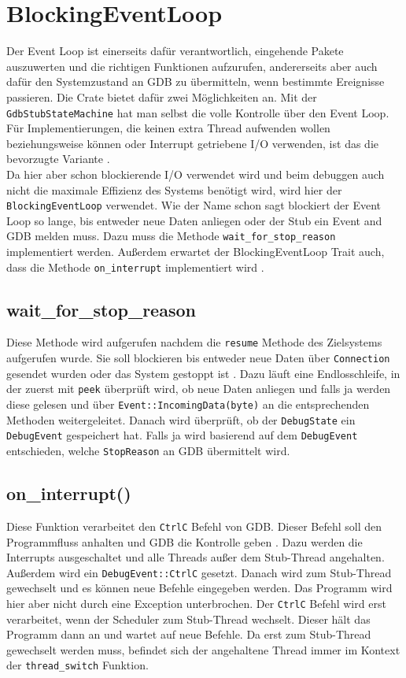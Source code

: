 \section{BlockingEventLoop}
Der Event Loop ist einerseits dafür verantwortlich, eingehende Pakete auszuwerten und die richtigen Funktionen aufzurufen, andererseits aber auch dafür den Systemzustand an GDB zu übermitteln, wenn bestimmte Ereignisse passieren. Die Crate bietet dafür zwei Möglichkeiten an. Mit der \texttt{GdbStubStateMachine} hat man selbst die volle Kontrolle über den Event Loop. Für Implementierungen, die keinen extra Thread aufwenden wollen beziehungsweise können oder Interrupt getriebene I/O verwenden, ist das die bevorzugte Variante \cite{gdbstub}.\\ 
Da hier aber schon blockierende I/O verwendet wird und beim debuggen auch nicht die maximale Effizienz des Systems benötigt wird, wird hier der \texttt{BlockingEventLoop} verwendet. Wie der Name schon sagt blockiert der Event Loop so lange, bis entweder neue Daten anliegen oder der Stub ein Event and GDB melden muss. Dazu muss die Methode \texttt{wait\_for\_stop\_reason} implementiert werden. Außerdem erwartet der BlockingEventLoop Trait auch, dass die Methode \texttt{on\_interrupt} implementiert wird \cite{gdbstub}.

\subsection{wait\_for\_stop\_reason}
Diese Methode wird aufgerufen nachdem die \texttt{resume} Methode des Zielsystems aufgerufen wurde. Sie soll blockieren bis entweder neue Daten über \texttt{Connection} gesendet wurden oder das System gestoppt ist \cite{gdbstub}. Dazu läuft eine Endlosschleife, in der zuerst mit \texttt{peek} überprüft wird, ob neue Daten anliegen und falls ja werden diese gelesen und über \texttt{Event::IncomingData(byte)} an die entsprechenden Methoden weitergeleitet. Danach wird überprüft, ob der \texttt{DebugState} ein \texttt{DebugEvent} gespeichert hat. Falls ja wird basierend auf dem \texttt{DebugEvent} entschieden, welche \texttt{StopReason} an GDB übermittelt wird.

\subsection{on\_interrupt()}
Diese Funktion verarbeitet den \texttt{CtrlC} Befehl von GDB. Dieser Befehl soll den Programmfluss anhalten und GDB die Kontrolle geben \cite{gdb}. Dazu werden die Interrupts ausgeschaltet und alle Threads außer dem Stub-Thread angehalten. Außerdem wird ein \texttt{DebugEvent::CtrlC} gesetzt. Danach wird zum Stub-Thread gewechselt und es können neue Befehle eingegeben werden. Das Programm wird hier aber nicht durch eine Exception unterbrochen. Der \texttt{CtrlC} Befehl wird erst verarbeitet, wenn der Scheduler zum Stub-Thread wechselt. Dieser hält das Programm dann an und wartet auf neue Befehle. Da erst zum Stub-Thread gewechselt werden muss, befindet sich der angehaltene Thread immer im Kontext der \texttt{thread\_switch} Funktion. 

